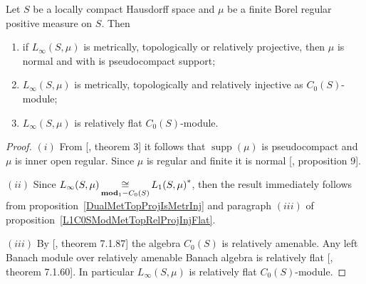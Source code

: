 \begin{proposition}\label{LinftyC0SModMetTopRelProjIngFlat} Let $S$ be a locally
compact Hausdorff space and $\mu$ be a finite Borel regular positive measure on
$S$. Then

\begin{enumerate}[label = (\roman*)]
    \item if $L_\infty(S,\mu)$ is metrically, topologically or relatively 
    projective, then $\mu$ is normal and with is pseudocompact support; 

    \item $L_\infty(S,\mu)$ is metrically, topologically and relatively 
    injective as $C_0(S)$-module;

    \item $L_\infty(S,\mu)$ is relatively flat $C_0(S)$-module.
\end{enumerate}
\end{proposition}
\begin{proof} $(i)$ From [\cite{NemRelProjModLp}, theorem 3] it follows 
that $\operatorname{supp}(\mu)$ is pseudocompact and $\mu$ is inner open 
regular. Since $\mu$ is regular and finite it is 
normal [\cite{NemRelProjModLp}, proposition 9].
    
$(ii)$ Since
$L_\infty(S,\mu)\mathop{\mathbin{\cong}}\limits_{\mathbf{mod}_1-C_0(S)}{L_1(S,\mu)}^*$, then the result
immediately follows from proposition~\ref{DualMetTopProjIsMetrInj} and paragraph
$(iii)$ of proposition~\ref{L1C0SModMetTopRelProjInjFlat}.

$(iii)$ By [\cite{HelBanLocConvAlg}, theorem 7.1.87] the algebra $C_0(S)$ is
relatively amenable. Any left Banach module over relatively amenable Banach
algebra is relatively flat [\cite{HelBanLocConvAlg}, theorem 7.1.60]. In
particular $L_\infty(S,\mu)$ is relatively flat $C_0(S)$-module.
\end{proof}

